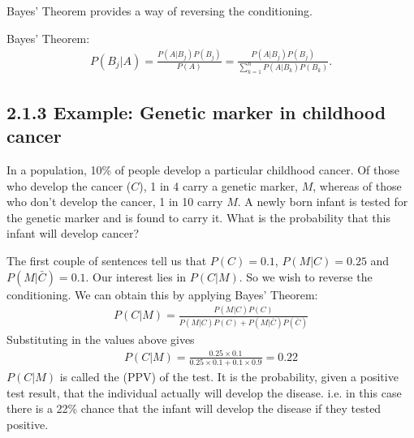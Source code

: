 \documentclass[letterpaper,10pt,english]{jupyterBook}
\begin{document}
\sphinxAtStartPar
Bayes’ Theorem provides a way of reversing the conditioning.



\sphinxAtStartPar
 Bayes’ Theorem:
\begin{equation*}
\begin{split}
P(B_{j}|A) = \frac{P(A|B_{j}) P(B_{j})}{P(A)} = \frac{P(A|B_{j}) P(B_{j})}{\sum^{n}_{k=1} P(A|B_{k}) P(B_{k})}.
\end{split}
\end{equation*}



\subsection{2.1.3 Example: Genetic marker in childhood cancer}
\label{\detokenize{02.b. Probability.Discrete:example-genetic-marker-in-childhood-cancer}}
\sphinxAtStartPar
In a population, 10\% of people develop a particular childhood cancer.  Of those who develop the cancer (\(C\)), 1 in 4 carry a genetic marker, \(M\), whereas of those who don’t develop the cancer, 1 in 10 carry \(M\).  A newly born infant is tested for the genetic marker and is found to carry it. What is the probability that this infant will develop cancer?

\sphinxAtStartPar
The first couple of sentences tell us that \(P(C) = 0.1\), \(P(M|C) = 0.25\)  and \(P(M | \bar{C})=0.1.\) Our interest lies in \(P(C|M)\). So we wish to reverse the conditioning. We can obtain this by applying Bayes’ Theorem:
\begin{equation*}
\begin{split}
P(C|M) = \frac{P(M|C)P(C)}{P(M|C)P(C) + P(M|\bar{C})P(\bar{C})}
\end{split}
\end{equation*}
\sphinxAtStartPar
Substituting in the values above gives
\begin{equation*}
\begin{split}
P(C|M) = \frac{0.25\times 0.1}{0.25\times 0.1 + 0.1\times 0.9}=0.22
\end{split}
\end{equation*}
\sphinxAtStartPar
\(P(C|M)\) is called the  (PPV) of the test.  It is the probability, given a positive test result, that the individual actually will develop the disease.  i.e. in this case there is a 22\% chance that the infant will develop the disease if they tested positive.
\end{document}

